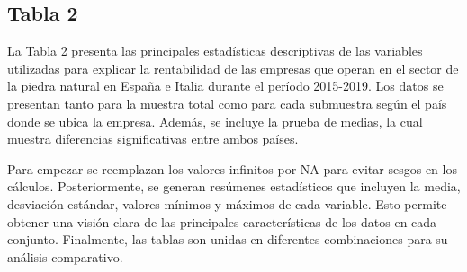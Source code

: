 \documentclass[
]{article}
\begin{document}
\subsection{Tabla 2}\label{tabla-2}

La Tabla 2 presenta las principales estadísticas descriptivas de las
variables utilizadas para explicar la rentabilidad de las empresas que
operan en el sector de la piedra natural en España e Italia durante el
período 2015-2019. Los datos se presentan tanto para la muestra total
como para cada submuestra según el país donde se ubica la empresa.
Además, se incluye la prueba de medias, la cual muestra diferencias
significativas entre ambos países.

Para empezar se reemplazan los valores infinitos por NA para evitar
sesgos en los cálculos. Posteriormente, se generan resúmenes
estadísticos que incluyen la media, desviación estándar, valores mínimos
y máximos de cada variable. Esto permite obtener una visión clara de las
principales características de los datos en cada conjunto. Finalmente,
las tablas son unidas en diferentes combinaciones para su análisis
comparativo.
\end{document}
